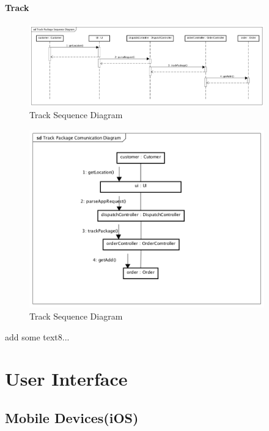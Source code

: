 \documentclass[12pt]{scrreprt}
\begin{document}
\subsubsection{Track}
\begin{figure}[H]
  \centering\includegraphics[width=4in]{DocumentRes/8SequenceDiagram_track.png}
  \caption{Track Sequence Diagram}
\end{figure}
\begin{figure}[H]
  \centering\includegraphics[width=4in]{DocumentRes/8CommunicationDiagram_track.png}
  \caption{Track Sequence Diagram}
\end{figure}
add some text8...

\chapter{User Interface}
\section{Mobile Devices(iOS)}
\end{document}
